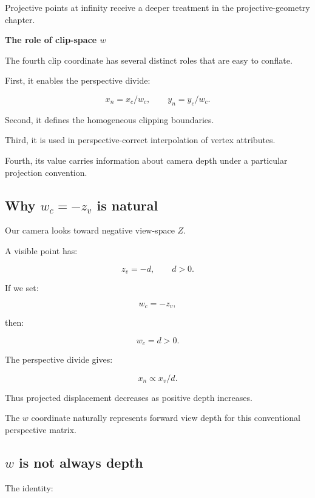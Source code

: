 Projective points at infinity receive a deeper treatment in the projective-geometry chapter.

\textbf{The role of clip-space \(w\)}

The fourth clip coordinate has several distinct roles that are easy to conflate.

First, it enables the perspective divide:

\[
 x_n=x_c/w_c, \qquad y_n=y_c/w_c.
\]

Second, it defines the homogeneous clipping boundaries.

Third, it is used in perspective-correct interpolation of vertex attributes.

Fourth, its value carries information about camera depth under a particular projection convention.

\subsection{\texorpdfstring{Why \(w_c=-z_v\) is natural}{Why w\_c=-z\_v is natural}}\label{02-foundations-ii-ch033-why-w_c-z_v-is-natural}

\hypertarget{02-foundations-ii-ch033-why-w_c-z_v-is-natural}{}

Our camera looks toward negative view-space \(Z\).

A visible point has:

\[
 z_v=-d, \qquad d>0.
\]

If we set:

\[
 w_c=-z_v,
\]

then:

\[
 w_c=d>0.
\]

The perspective divide gives:

\[
 x_n\propto x_v/d.
\]

Thus projected displacement decreases as positive depth increases.

The \(w\) coordinate naturally represents forward view depth for this conventional perspective matrix.

\subsection{\texorpdfstring{\(w\) is not always depth}{w is not always depth}}\label{02-foundations-ii-ch033-w-is-not-always-depth}

\hypertarget{02-foundations-ii-ch033-w-is-not-always-depth}{}

The identity:

